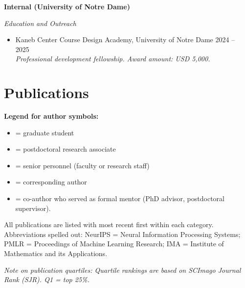 \documentclass[letterpaper,oneside]{article}
\begin{document}
\noindent\textbf{Internal (University of Notre Dame)}

\noindent\textit{Education and Outreach}
\begin{itemize}[leftmargin=0pt, label={}]
	\item Kaneb Center Course Design Academy, University of Notre Dame \hfill 2024 -- 2025\\
	\textit{Professional development fellowship. Award amount: USD 5,000.}
\end{itemize}
%

\section*{Publications}

\noindent\textbf{Legend for author symbols:}
\begin{itemize}
  \item[@] = graduate student
  \item[\%] = postdoctoral research associate
  \item[$\dagger$] = senior personnel (faculty or research staff)
  \item[*] = corresponding author
  \item[\#] = co-author who served as formal mentor (PhD advisor, postdoctoral supervisor).
\end{itemize}

\noindent All publications are listed with most recent first within each category. Abbreviations spelled out: NeurIPS = Neural Information Processing Systems; PMLR = Proceedings of Machine Learning Research; IMA = Institute of Mathematics and its Applications.

\smallskip
\noindent\textit{Note on publication quartiles: Quartile rankings are based on SCImago Journal Rank (SJR). Q1 = top 25\%.}
\end{document}
